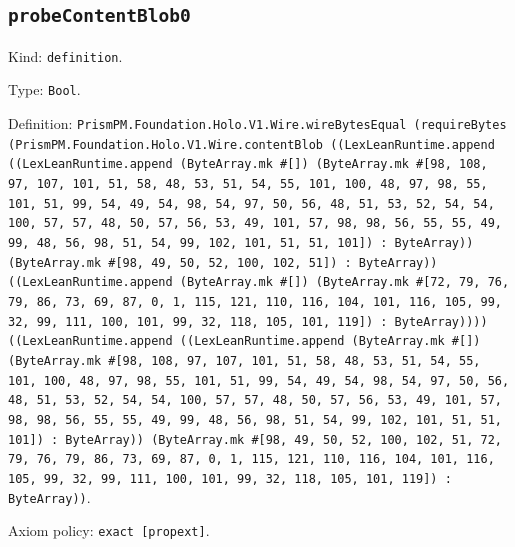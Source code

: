 \documentclass[11pt]{article}
\begin{document}
\subsection*{\texttt{probeContentBlob0}}
\noindent Kind: \texttt{definition}.\par
\noindent Type: \texttt{Bool}.\par
\noindent Definition: \texttt{PrismPM.Foundation.Holo.V1.Wire.wireBytesEqual (requireBytes (PrismPM.Foundation.Holo.V1.Wire.contentBlob ((LexLeanRuntime.append ((LexLeanRuntime.append (ByteArray.mk \#[]) (ByteArray.mk \#[98, 108, 97, 107, 101, 51, 58, 48, 53, 51, 54, 55, 101, 100, 48, 97, 98, 55, 101, 51, 99, 54, 49, 54, 98, 54, 97, 50, 56, 48, 51, 53, 52, 54, 54, 100, 57, 57, 48, 50, 57, 56, 53, 49, 101, 57, 98, 98, 56, 55, 55, 49, 99, 48, 56, 98, 51, 54, 99, 102, 101, 51, 51, 101]) : ByteArray)) (ByteArray.mk \#[98, 49, 50, 52, 100, 102, 51]) : ByteArray)) ((LexLeanRuntime.append (ByteArray.mk \#[]) (ByteArray.mk \#[72, 79, 76, 79, 86, 73, 69, 87, 0, 1, 115, 121, 110, 116, 104, 101, 116, 105, 99, 32, 99, 111, 100, 101, 99, 32, 118, 105, 101, 119]) : ByteArray)))) ((LexLeanRuntime.append ((LexLeanRuntime.append (ByteArray.mk \#[]) (ByteArray.mk \#[98, 108, 97, 107, 101, 51, 58, 48, 53, 51, 54, 55, 101, 100, 48, 97, 98, 55, 101, 51, 99, 54, 49, 54, 98, 54, 97, 50, 56, 48, 51, 53, 52, 54, 54, 100, 57, 57, 48, 50, 57, 56, 53, 49, 101, 57, 98, 98, 56, 55, 55, 49, 99, 48, 56, 98, 51, 54, 99, 102, 101, 51, 51, 101]) : ByteArray)) (ByteArray.mk \#[98, 49, 50, 52, 100, 102, 51, 72, 79, 76, 79, 86, 73, 69, 87, 0, 1, 115, 121, 110, 116, 104, 101, 116, 105, 99, 32, 99, 111, 100, 101, 99, 32, 118, 105, 101, 119]) : ByteArray))}.\par
\noindent Axiom policy: \texttt{exact [propext]}.\par
\end{document}
